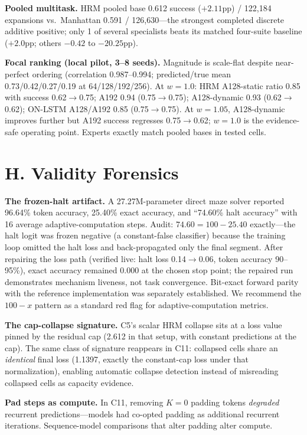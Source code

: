 \documentclass[letterpaper]{article} %
\newcommand{\stage}[1]{\textsc{#1}}
\begin{document}
\textbf{Pooled multitask.} HRM pooled base 0.612 success ($+2.11$pp) / 122{,}184 expansions vs.\ Manhattan 0.591 / 126{,}630---the strongest completed discrete additive positive; only 1 of several specialists beats its matched four-suite baseline ($+2.0$pp; others $-0.42$ to $-20.25$pp).

\textbf{Focal ranking (local pilot, 3--8 seeds).} Magnitude is scale-flat despite near-perfect ordering (correlation 0.987--0.994; predicted/true mean 0.73/0.42/0.27/0.19 at 64/128/192/256). At $w{=}1.0$: HRM A128-static ratio 0.85 with success 0.62$\to$0.75; A192 0.94 (0.75$\to$0.75); A128-dynamic 0.93 (0.62$\to$0.62); ON-LSTM A128/A192 0.85 (0.75$\to$0.75). At $w{=}1.05$, A128-dynamic improves further but A192 success regresses 0.75$\to$0.62; $w{=}1.0$ is the evidence-safe operating point. Experts exactly match pooled bases in tested cells.

\section{H. Validity Forensics}

\textbf{The frozen-halt artifact.} A 27.27M-parameter direct maze solver reported 96.64\% token accuracy, 25.40\% exact accuracy, and ``74.60\% halt accuracy'' with 16 average adaptive-computation steps. Audit: $74.60 = 100 - 25.40$ exactly---the halt logit was frozen negative (a constant-false classifier) because the training loop omitted the halt loss and back-propagated only the final segment. After repairing the loss path (verified live: halt loss 0.14$\to$0.06, token accuracy 90--95\%), exact accuracy remained 0.000 at the chosen stop point; the repaired run demonstrates mechanism liveness, not task convergence. Bit-exact forward parity with the reference implementation was separately established. We recommend the $100{-}x$ pattern as a standard red flag for adaptive-computation metrics.

\textbf{The cap-collapse signature.} \stage{C5}'s scalar HRM collapse sits at a loss value pinned by the residual cap (2.612 in that setup, with constant predictions at the cap). The same class of signature reappears in \stage{C11}: collapsed cells share an \emph{identical} final loss (1.1397, exactly the constant-cap loss under that normalization), enabling automatic collapse detection instead of misreading collapsed cells as capacity evidence.

\textbf{Pad steps as compute.} In \stage{C11}, removing $K{=}0$ padding tokens \emph{degraded} recurrent predictions---models had co-opted padding as additional recurrent iterations. Sequence-model comparisons that alter padding alter compute.
\end{document}

